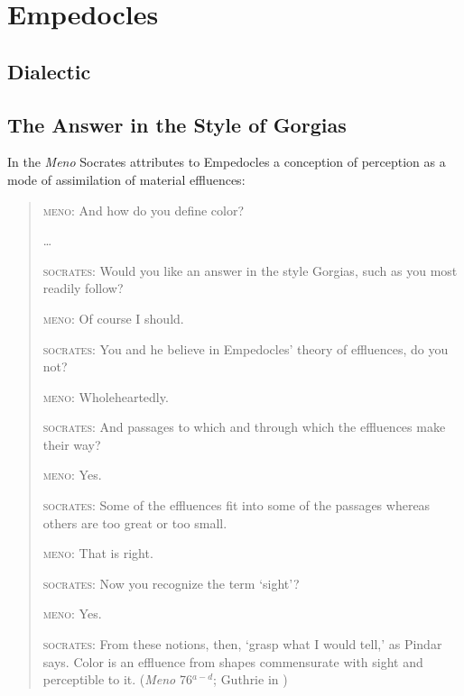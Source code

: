 \chapter{Empedocles} %
\label{cha:empedocles}

\section{Dialectic} %
\label{sec:dialectic}


\section{The Answer in the Style of Gorgias} %
\label{sec:the_answer_in_the_style_of_gorgias}

In the \emph{Meno} Socrates attributes to Empedocles a conception of perception as a mode of assimilation of material effluences:
\begin{quotation}
    \textsc{meno}: And how do you define color?
    
    \ldots
    
    \textsc{socrates}: Would you like an answer in the style Gorgias, such as you most readily follow?
    
    \textsc{meno}: Of course I should.
    
    \textsc{socrates}: You and he believe in Empedocles' theory of effluences, do you not?
    
    \textsc{meno}: Wholeheartedly.
    
    \textsc{socrates}: And passages to which and through which the effluences make their way?
    
    \textsc{meno}: Yes.
    
    \textsc{socrates}: Some of the effluences fit into some of the passages whereas others are too great or too small.
    
    \textsc{meno}: That is right.
    
    \textsc{socrates}: Now you recognize the term `sight'?
    
    \textsc{meno}: Yes.
    
    \textsc{socrates}: From these notions, then, `grasp what I would tell,' as Pindar says. Color is an effluence from shapes commensurate with sight and perceptible to it. (\emph{Meno} 76\( ^{a-d} \); Guthrie in \citealt[359]{Hamilton:1989fk})
\end{quotation}


